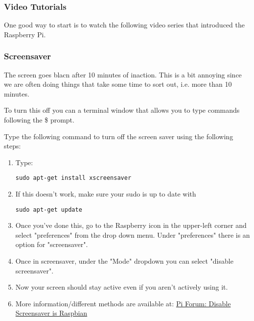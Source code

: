 \documentclass{article}\usepackage[]{graphicx}\usepackage[]{color}
\begin{document}
\subsubsection{Video Tutorials}

One good way to start is to watch the following video series that introduced the Raspberry Pi. 


\subsubsection{Screensaver}

The screen goes blacn after 10 minutes of inaction. This is a bit annoying since we are often doing things that take some time to sort out, i.e. more than 10 minutes. 

To turn this off you can a terminal window that allows you to type commands following the \$ prompt. 

Type the following command to turn off the screen saver using the following steps: 

\begin{enumerate}

\item Type: 

\begin{lstlisting}
sudo apt-get install xscreensaver
\end{lstlisting}

\item If this doesn't work, make sure your sudo is up to date with 
\begin{lstlisting}
sudo apt-get update
\end{lstlisting}

\item Once you've done this, go to the Raspberry icon in the upper-left corner and select "preferences" from the drop down menu.  Under "preferences" there is an option for "screensaver".

\item Once in screensaver, under the "Mode" dropdown you can select "disable screensaver".

\item Now your screen should stay active even if you aren't actively using it.

\item More information/different methods are available at: \href{https://www.raspberrypi.org/forums/viewtopic.php?f=91&t=57552}{Pi Forum:  Disable Screensaver is Raspbian}

\end{enumerate}
\end{document}
